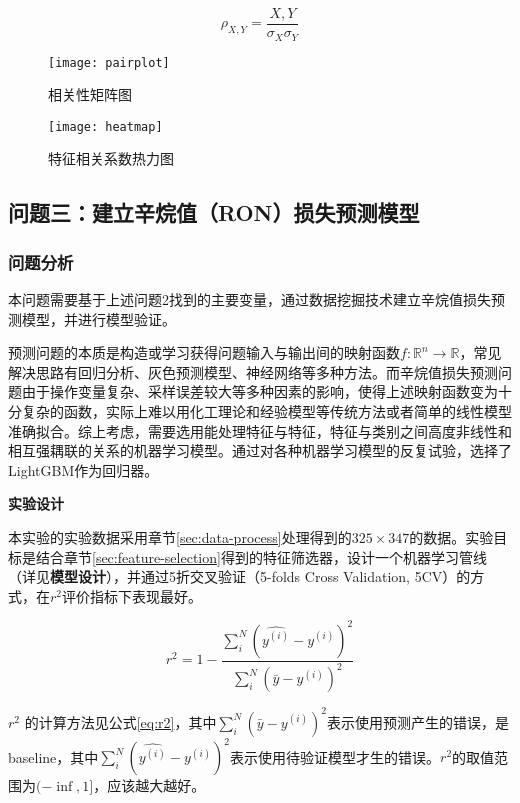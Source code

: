 \documentclass[bwprint]{gmcmthesis}
\begin{document}
\begin{equation}\label{eq:pearson}
	\rho_{X,Y}=\frac{X,Y}{\sigma_X\sigma_Y}
\end{equation}


\begin{figure}[htb]
	\centering
	\texttt{[image: pairplot]}
	\caption{相关性矩阵图}
\end{figure}

\begin{figure}[htb]
	\centering
	\texttt{[image: heatmap]}
	\caption{特征相关系数热力图}
\end{figure}



\FloatBarrier
\subsection{问题三：建立辛烷值（RON）损失预测模型}\label{sec:modeling}

\FloatBarrier
\subsubsection{问题分析}

本问题需要基于上述问题2找到的主要变量，通过数据挖掘技术建立辛烷值损失预测模型，并进行模型验证。

预测问题的本质是构造或学习获得问题输入与输出间的映射函数$f: \mathbb{R}^n \rightarrow \mathbb{R}$，常见解决思路有回归分析、灰色预测模型、神经网络等多种方法。而辛烷值损失预测问题由于操作变量复杂、采样误差较大等多种因素的影响，使得上述映射函数变为十分复杂的函数，实际上难以用化工理论和经验模型等传统方法或者简单的线性模型准确拟合。综上考虑，需要选用能处理特征与特征，特征与类别之间高度非线性和相互强耦联的关系的机器学习模型。通过对各种机器学习模型的反复试验，选择了LightGBM作为回归器。

\textbf{实验设计}

本实验的实验数据采用章节\ref{sec:data-process}处理得到的$325 \times 347$的数据。实验目标是结合章节\ref{sec:feature-selection}得到的特征筛选器，设计一个机器学习管线（详见\textbf{模型设计}），并通过5折交叉验证（5-folds Cross Validation, 5CV）的方式，在$r^2$评价指标下表现最好。

\begin{equation}\label{eq:r2}
	r^2=1-\frac{\sum_i^N(\hat{y^{(i)}}-y^{(i)})^2}{\sum_i^N(\bar{y}-y^{(i)})^2}
\end{equation}

$r^2$ 的计算方法见公式\eqref{eq:r2}，其中$\sum_i^N(\bar{y}-y^{(i)})^2$表示使用预测产生的错误，是baseline，其中$\sum_i^N(\hat{y^{(i)}}-y^{(i)})^2$表示使用待验证模型才生的错误。$r^2$的取值范围为$(-\inf, 1]$，应该越大越好。
\end{document}
